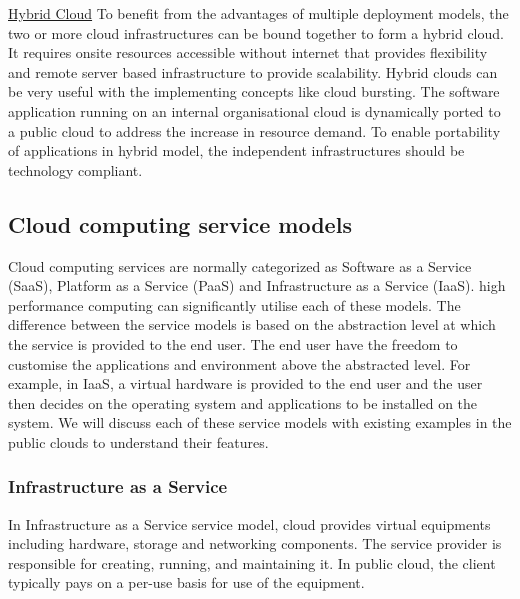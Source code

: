 \documentclass[12pt,a4paper]{report}
\begin{document}
\underline{Hybrid Cloud}
To benefit from the advantages of multiple deployment models, the two or more cloud infrastructures can be bound together to form a hybrid cloud.
It requires onsite resources accessible without internet that provides flexibility and remote server based infrastructure to provide scalability. 
Hybrid clouds can be very useful with the implementing concepts like cloud bursting\cite{}. 
The software application running on an internal organisational cloud is dynamically ported to a public cloud to address the increase in resource demand. To enable portability of applications in hybrid model, the independent infrastructures should be technology compliant.  


\subsection{Cloud computing service models}  

Cloud computing services are normally categorized as Software as a Service (SaaS), Platform as a Service (PaaS) and Infrastructure as a Service (IaaS).
high performance computing can significantly utilise each of these models.
The difference between the service models is based on the abstraction level at which the service is provided to the
end user. The end user have the freedom to customise the applications and environment above the abstracted level. 
For example, in IaaS, a virtual hardware is provided to the end user and the user then decides on the operating system and applications to be installed on the system. 
We will discuss each of these service models with existing examples in the public clouds to understand their features.

\subsubsection{Infrastructure as a Service}

In Infrastructure as a Service service model, cloud provides virtual equipments including hardware, storage and networking components. 
The service provider is responsible for creating, running, and maintaining it. 
In public cloud, the client typically pays on a per-use basis for use of the equipment.
\end{document}
